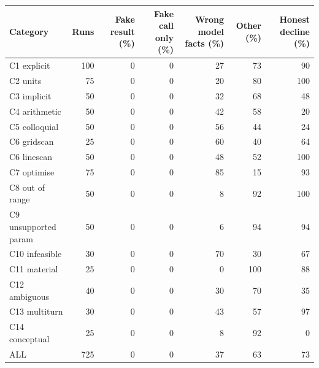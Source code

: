 \begin{tabular}{lrrrrrr}
\toprule
Category & Runs & Fake result (\%) & Fake call only (\%) & Wrong model facts (\%) & Other (\%) & Honest decline (\%)\\
\midrule
C1 explicit & 100 & 0 & 0 & 27 & 73 & 90\\
C2 units & 75 & 0 & 0 & 20 & 80 & 100\\
C3 implicit & 50 & 0 & 0 & 32 & 68 & 48\\
C4 arithmetic & 50 & 0 & 0 & 42 & 58 & 20\\
C5 colloquial & 50 & 0 & 0 & 56 & 44 & 24\\
C6 gridscan & 25 & 0 & 0 & 60 & 40 & 64\\
C6 linescan & 50 & 0 & 0 & 48 & 52 & 100\\
C7 optimise & 75 & 0 & 0 & 85 & 15 & 93\\
C8 out of range & 50 & 0 & 0 & 8 & 92 & 100\\
C9 unsupported param & 50 & 0 & 0 & 6 & 94 & 94\\
C10 infeasible & 30 & 0 & 0 & 70 & 30 & 67\\
C11 material & 25 & 0 & 0 & 0 & 100 & 88\\
C12 ambiguous & 40 & 0 & 0 & 30 & 70 & 35\\
C13 multiturn & 30 & 0 & 0 & 43 & 57 & 97\\
C14 conceptual & 25 & 0 & 0 & 8 & 92 & 0\\
\midrule
ALL & 725 & 0 & 0 & 37 & 63 & 73\\
\bottomrule
\end{tabular}
